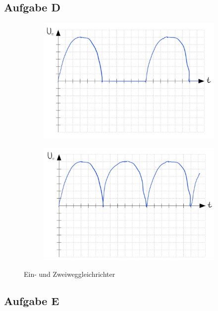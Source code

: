 \subsection*{Aufgabe D}
\begin{figure}[H]
    \begin{subfigure}[b]{0.45\textwidth}
        \includegraphics[width=\textwidth]{Voraufgaben/Da.jpg}
        \caption{}
        \label{fig:VA_D_a}
    \end{subfigure}
    \hfill
    \begin{subfigure}[b]{0.45\textwidth}
        \includegraphics[width=\textwidth]{Voraufgaben/Db.jpg}
        \caption{}
        \label{fig:VA_D_b}
    \end{subfigure}
    \caption{Ein- und Zweiweggleichrichter}
\end{figure}

\subsection*{Aufgabe E}
